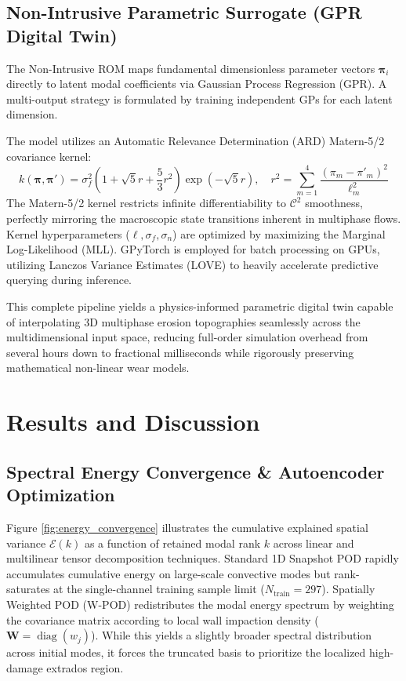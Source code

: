 \documentclass{article}
\begin{document}
\subsection{Non-Intrusive Parametric Surrogate (GPR Digital Twin)}
The Non-Intrusive ROM maps fundamental dimensionless parameter vectors $\bm{\pi}_i$ directly to latent modal coefficients via Gaussian Process Regression (GPR). A multi-output strategy is formulated by training independent GPs for each latent dimension.

The model utilizes an Automatic Relevance Determination (ARD) Matern-5/2 covariance kernel:
\begin{equation}
    k(\bm{\pi}, \bm{\pi}') = \sigma_f^2 \left(1 + \sqrt{5}r + \frac{5}{3}r^2\right) \exp\left(-\sqrt{5}r\right), \quad r^2 = \sum_{m=1}^4 \frac{(\pi_m - \pi'_m)^2}{\ell_m^2}
\end{equation}
The Matern-5/2 kernel restricts infinite differentiability to $\mathcal{C}^2$ smoothness, perfectly mirroring the macroscopic state transitions inherent in multiphase flows. Kernel hyperparameters ($\boldsymbol{\ell}, \sigma_f, \sigma_n$) are optimized by maximizing the Marginal Log-Likelihood (MLL). GPyTorch is employed for batch processing on GPUs, utilizing Lanczos Variance Estimates (LOVE) to heavily accelerate predictive querying during inference.

This complete pipeline yields a physics-informed parametric digital twin capable of interpolating 3D multiphase erosion topographies seamlessly across the multidimensional input space, reducing full-order simulation overhead from several hours down to fractional milliseconds while rigorously preserving mathematical non-linear wear models.

\section{Results and Discussion}
\label{sec:results}

\subsection{Spectral Energy Convergence \& Autoencoder Optimization}
Figure \ref{fig:energy_convergence} illustrates the cumulative explained spatial variance $\mathcal{E}(k)$ as a function of retained modal rank $k$ across linear and multilinear tensor decomposition techniques. Standard 1D Snapshot POD rapidly accumulates cumulative energy on large-scale convective modes but rank-saturates at the single-channel training sample limit ($N_{\mathrm{train}} = 297$). Spatially Weighted POD (W-POD) redistributes the modal energy spectrum by weighting the covariance matrix according to local wall impaction density ($\mathbf{W} = \operatorname{diag}(w_j)$). While this yields a slightly broader spectral distribution across initial modes, it forces the truncated basis to prioritize the localized high-damage extrados region. 
\end{document}
